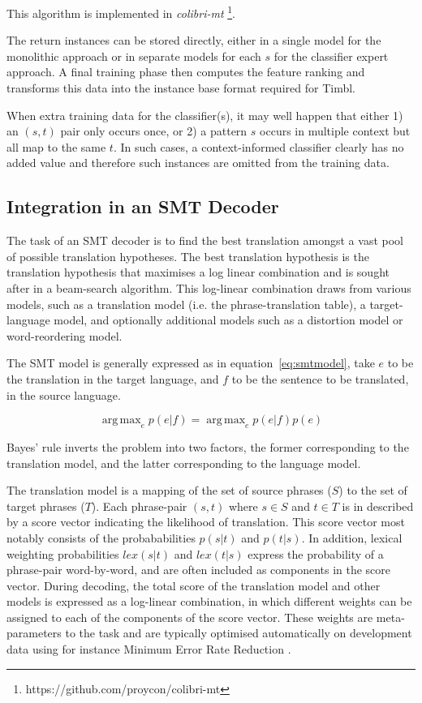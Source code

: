 \documentclass[11pt]{article}
\theoremstyle{break}
\DeclareMathOperator*{\argmax}{arg\,max}
\begin{document}
This algorithm is implemented in \emph{colibri-mt}
\footnote{https://github.com/proycon/colibri-mt}.

The return instances can be stored directly, either in a single model for the
monolithic approach or in separate models for each $s$ for the classifier
expert approach. A final training phase then computes the feature ranking and
transforms this data into the instance base format required for Timbl.

When extra training data for the classifier(s), it may well happen that either
1) an $(s,t)$ pair only occurs once, or 2) a pattern $s$ occurs in multiple
context but all map to the same $t$. In such cases, a context-informed
classifier clearly has no added value and therefore such instances are omitted from the training data.  

\subsection{Integration in an SMT Decoder}
\label{sec:smtintegration}

The task of an SMT decoder is to find the best translation amongst a vast pool
of possible translation hypotheses. The best translation hypothesis is the
translation hypothesis that maximises a log linear combination and is sought
after in a beam-search algorithm. This log-linear combination draws from
various models, such as a translation model (i.e. the phrase-translation
table), a target-language model, and optionally additional models such as a
distortion model or word-reordering model. 

The SMT model is generally expressed as in equation~\ref{eq:smtmodel}, take $e$
to be the translation in the target language, and $f$ to be the sentence to be
translated, in the source language.

\begin{equation}
\argmax_e p(e|f) = \argmax_e p(e|f)p(e)
\label{eq:smtmodel}
\end{equation}

Bayes' rule inverts the problem into two factors, the former corresponding to
the translation model, and the latter corresponding to the language model. 

The translation model is a mapping of the set of source phrases ($S$) to the
set of target phrases ($T$). Each phrase-pair $(s,t)$ where $s \in S$ and $t
\in T$ is in described by a score vector indicating the likelihood of
translation. This score vector most notably consists of the probababilities
$p(s|t)$ and $p(t|s)$. In addition, lexical weighting probabilities $lex(s|t)$
and $lex(t|s)$ express the probability of a phrase-pair word-by-word, and are
often included as components in the score vector. During decoding, the total
score of the translation model and other models is expressed as a log-linear
combination, in which different weights can be assigned to each of the
components of the score vector. These weights are meta-parameters to the task and
are typically optimised automatically on development data using for instance
Minimum Error Rate Reduction \citep{MERT}.
\end{document}
